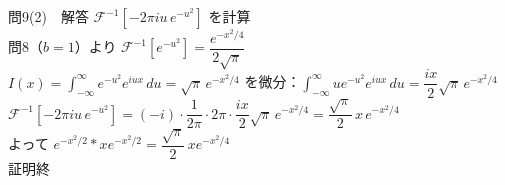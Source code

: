 \documentclass[professionalfonts]{beamer}
\begin{document}
\begin{frame}{問9(2)　解答}
  $\mathcal{F}^{-1}[-2\pi iu\,e^{-u^{2}}]$ を計算\\[6pt]
  問8（$b=1$）より $\mathcal{F}^{-1}[e^{-u^{2}}] = \dfrac{e^{-x^{2}/4}}{2\sqrt{\pi}}$\\[6pt]
  $I(x)=\displaystyle\int_{-\infty}^{\infty}e^{-u^{2}}e^{iux}\,du = \sqrt{\pi}\,e^{-x^{2}/4}$ を微分：$\int_{-\infty}^{\infty}ue^{-u^{2}}e^{iux}\,du = \dfrac{ix}{2}\sqrt{\pi}\,e^{-x^{2}/4}$\\[6pt]
  $\mathcal{F}^{-1}[-2\pi iu\,e^{-u^{2}}] = (-i)\cdot\dfrac{1}{2\pi}\cdot2\pi\cdot\dfrac{ix}{2}\sqrt{\pi}\,e^{-x^{2}/4} = \dfrac{\sqrt{\pi}}{2}\,x\,e^{-x^{2}/4}$\\[6pt]
  よって $e^{-x^{2}/2}*xe^{-x^{2}/2} = \dfrac{\sqrt{\pi}}{2}\,xe^{-x^{2}/4}$
  \\[6pt]\hfill 証明終
\end{frame}
\end{document}
